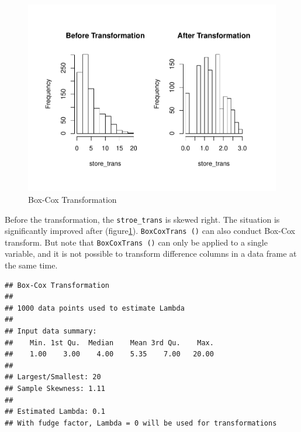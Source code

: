 \documentclass[]{book}
\newenvironment{Shaded}{\begin{snugshade}}{\end{snugshade}}
\newcommand{\KeywordTok}[1]{\textcolor[rgb]{0.13,0.29,0.53}{\textbf{{#1}}}}
\newcommand{\NormalTok}[1]{{#1}}
\theoremstyle{definition}
\theoremstyle{definition}
\theoremstyle{remark}
\begin{document}
\begin{figure}

{\centering \includegraphics[width=0.8\linewidth]{CE_JSM2017_files/figure-latex/bc-1} 

}

\caption{Box-Cox Transformation}\label{fig:bc}
\end{figure}

Before the transformation, the \texttt{stroe\_trans} is skewed right.
The situation is significantly improved after (figure\ref{fig:bc}).
\texttt{BoxCoxTrans\ ()} can also conduct Box-Cox transform. But note
that \texttt{BoxCoxTrans\ ()} can only be applied to a single variable,
and it is not possible to transform difference columns in a data frame
at the same time.

\begin{Shaded}
\end{Shaded}

\begin{verbatim}
## Box-Cox Transformation
## 
## 1000 data points used to estimate Lambda
## 
## Input data summary:
##    Min. 1st Qu.  Median    Mean 3rd Qu.    Max. 
##    1.00    3.00    4.00    5.35    7.00   20.00 
## 
## Largest/Smallest: 20 
## Sample Skewness: 1.11 
## 
## Estimated Lambda: 0.1 
## With fudge factor, Lambda = 0 will be used for transformations
\end{verbatim}

\begin{Shaded}
\end{Shaded}
\end{document}
